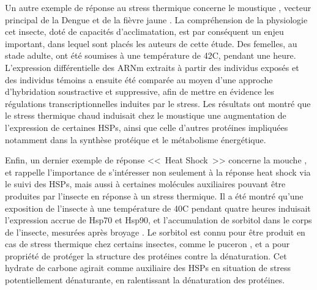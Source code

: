 		Un autre exemple de réponse au stress thermique concerne le moustique , vecteur principal de la Dengue et de la fièvre jaune \cite{zhao2009}.
		La compréhension de la physiologie cet insecte, doté de capacités d'acclimatation, est par conséquent un enjeu important, dans lequel sont placés les auteurs de cette étude. 
		Des femelles, au stade adulte, ont été soumises à une température de 42\textdegree{}C, pendant une heure.
		L'expression différentielle des ARNm extraits à partir des individus exposés et des individus témoins a ensuite été comparée au moyen d'une approche d'hybridation soustractive et suppressive, afin de mettre en évidence les régulations transcriptionnelles induites par le stress.
		Les résultats ont montré que le stress thermique chaud induisait chez le moustique
		une augmentation de l'expression de certaines HSPs, ainsi que celle d'autres protéines impliquées notamment dans la synthèse protéique et le métabolisme énergétique.



		Enfin, un dernier exemple de réponse <<~Heat Shock~>> concerne la mouche , et rappelle l'importance de s'intéresser non seulement à la réponse heat shock via le suivi des HSPs, mais aussi à certaines molécules auxiliaires pouvant être produites par l'insecte en réponse à un stress thermique.
		Il a été montré qu'une exposition de l'insecte à une température de 40\textdegree{}C pendant quatre heures induisait l'expression accrue de Hsp70 et Hsp90, et l'accumulation de sorbitol dans le corps de l'insecte, mesurées après broyage \cite{salvucci2000}.
		Le sorbitol est connu pour être produit en cas de stress thermique chez certains insectes, comme le puceron \cite{hendrix1998}, et a pour propriété de protéger la structure des protéines contre la dénaturation.
		Cet hydrate de carbone agirait comme auxiliaire des HSPs en situation de stress potentiellement dénaturante, en ralentissant la dénaturation des protéines.

